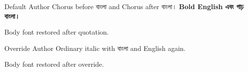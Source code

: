 \documentclass[oneside,openany]{bookbangla}
\begin{document}
\begin{chapquote}{Default Author}
Chorus before বাংলা and Chorus after বাংলা।
\textbf{Bold English এবং গাঢ় বাংলা।}
\makeatletter
{}
\makeatother
\end{chapquote}
Body font restored after quotation.

\begin{chapquote}{Override Author}
Ordinary italic with বাংলা and English again.
\end{chapquote}
Body font restored after override.
\end{document}

